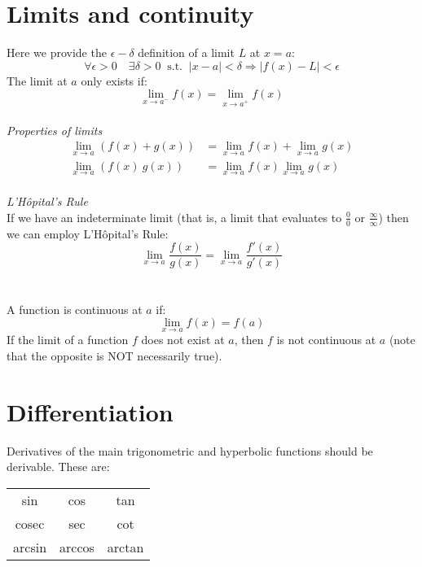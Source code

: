 \documentclass{scrartcl}
\begin{document}
\section{Limits and continuity}
Here we provide the $ \epsilon - \delta $ definition of a limit $ L $ at $ x = a $:
\begin{equation}
\forall \epsilon > 0 \quad \exists \delta > 0 \ \textrm{ s.t. } \ |x - a| < \delta \Rightarrow |f(x) - L| < \epsilon
\end{equation}
The limit at $ a $ only exists if:
\begin{equation}
\lim_{x \to a^{-}} f(x) = \lim_{x \to a^{+}} f(x)
\end{equation}
\\
\textit{Properties of limits}
\begin{align}
\lim_{x \to a^{}} (f(x) + g(x)) & = \lim_{x \to a^{}} f(x) + \lim_{x \to a^{}} g(x) \\
\lim_{x \to a^{}} (f(x) \ g(x)) & = \lim_{x \to a^{}} f(x) \lim_{x \to a^{}} g(x)
\end{align}
\\
\textit{L'H\^{o}pital's Rule}
\\
If we have an indeterminate limit (that is, a limit that evaluates to $ \frac{0}{0} $ or $ \frac{\infty}{\infty} $) then we can employ L'H\^{o}pital's Rule:
\begin{equation}
\lim_{x \to a^{}} \frac{f(x)}{g(x)} = \lim_{x \to a^{}} \frac{f'(x)}{g'(x)}
\end{equation}
\\\\
A function is continuous at $ a $ if:
\begin{equation}
\lim_{x \to a} f(x) = f(a)
\end{equation}
If the limit of a function $ f $ does not exist at $ a $, then $ f $ is not continuous at $ a $ (note that the opposite is NOT necessarily true).

\section{Differentiation}
Derivatives of the main trigonometric and hyperbolic functions should be derivable. These are:
\begin{center}
\begin{tabular}{c c c}
sin & cos & tan \\
cosec & sec & cot \\
arcsin & arccos & arctan \\
\end{tabular}
\end{center}
\end{document}
